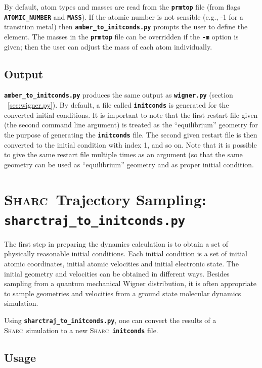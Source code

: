 \documentclass[a4paper,10pt,DIV=15,openany]{scrbook}
\newcommand{\sharc}{\textsc{Sharc}}
\newcommand{\ttt}[1]{\textbf{\texttt{#1}}}
\begin{document}
By default, atom types and masses are read from the \ttt{prmtop} file (from flags \ttt{ATOMIC\_NUMBER} and \ttt{MASS}). 
If the atomic number is not sensible (e.g., -1 for a transition metal) then \ttt{amber\_to\_initconds.py} prompts the user to define the element.
The masses in the \ttt{prmtop} file can be overridden if the \ttt{-m} option is given; then the user can adjust the mass of each atom individually.

\subsection{Output}

\ttt{amber\_to\_initconds.py} produces the same output as \ttt{wigner.py} (section ~\ref{sec:wigner.py}).
By default, a file called \ttt{initconds} is generated for the converted initial conditions. 
It is important to note that the first restart file given (the second command line argument) is treated as the ``equilibrium'' geometry for the purpose of generating the \ttt{initconds} file.
The second given restart file is then converted to the initial condition with index 1, and so on.
Note that it is possible to give the same restart file multiple times as an argument (so that the same geometry can be used as ``equilibrium'' geometry and as proper initial condition.





\section{\sharc\ Trajectory Sampling: \ttt{sharctraj\_to\_initconds.py}}\label{sec:sharctraj_to_initconds.py}

The first step in preparing the dynamics calculation is to obtain a set of physically reasonable initial conditions. Each initial condition is a set of initial atomic coordinates, initial atomic velocities and initial electronic state. The initial geometry and velocities can be obtained in different ways. 
Besides sampling from a quantum mechanical Wigner distribution, it is often appropriate to sample geometries and velocities from a ground state molecular dynamics simulation.

Using \ttt{sharctraj\_to\_initconds.py}, one can convert the results of a \sharc\ simulation to a new \sharc\ \ttt{initconds} file.

\subsection{Usage}
\end{document}
